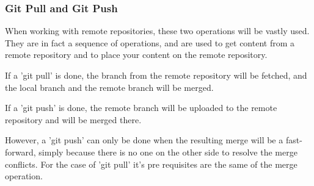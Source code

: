 \subsubsection{Git Pull and Git Push}

When working with remote repositories, these two operations will be vastly
used. They are in fact a sequence of operations, and are used to get content
from a remote repository and to place your content on the remote repository.
\par
If a 'git pull' is done, the branch from the remote repository will be fetched,
and the local branch and the remote branch will be merged. \par
If a 'git push' is done, the remote branch will be uploaded to the remote 
repository and will be merged there. \par
However, a 'git push' can only be done when the resulting merge will be a
fast-forward, simply because there is no one on the other side to resolve the 
merge conflicts. For the case of 'git pull' it's pre requisites are the same of
the merge operation. \par
